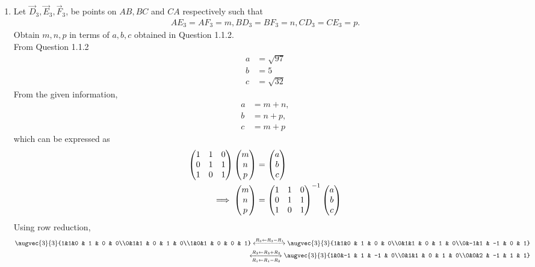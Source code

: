 \documentclass[11pt]{book}
\begin{document}
\begin{enumerate}[label=\thesection.\arabic*.,ref=\thesection.\theenumi]


\item Let $\vec{D}_3, \vec{E}_3, \vec{F}_3$, be points on $AB, BC$ and $CA$ respectively such that
\begin{align}
AE_3 = AF_3 = m, BD_3 = BF_3 = n, CD_3 = CE_3 = p.
\end{align}
Obtain $m,n,p$ in terms of $a,b,c$ obtained in Question 1.1.2. \\ 
\solution 
From Question 1.1.2
\begin{align}
    a &= \sqrt{97} \\ b &= 5 \\ c &= \sqrt{32}
\end{align}
From the given information, 
\begin{align}
% 
    a &= m+n,\\
    b &= n+p, \\
    c &= m+p 
\end{align}
which can be expressed as
\begin{align}
\begin{pmatrix}1&1&0\\0&1&1\\1&0&1\\\end{pmatrix}\begin{pmatrix}m\\n\\p\end{pmatrix} &= \begin{pmatrix}a\\b\\c\end{pmatrix}
\\
\implies 
	\begin{pmatrix}m\\n\\p\end{pmatrix} &= \begin{pmatrix}1&1&0\\0&1&1\\1&0&1\\\end{pmatrix}^{-1}\begin{pmatrix}a\\b\\c\end{pmatrix}
\end{align}
Using row reduction,
\begin{align}
\augvec{3}{3}{1&1&0 & 1 & 0 & 0\\0&1&1 & 0 & 1 & 0\\1&0&1 & 0 & 0 & 1}
\xleftrightarrow[]{R_3 \leftarrow R_3 - R_1}
\augvec{3}{3}{1&1&0 & 1 & 0 & 0\\0&1&1 & 0 & 1 & 0\\0&-1&1 & -1 & 0 & 1} \\
\xleftrightarrow[R_1 \leftarrow R_1 - R_2]{R_3 \leftarrow R_3 + R_2}
\augvec{3}{3}{1&0&-1 & 1 & -1 & 0\\0&1&1 & 0 & 1 & 0\\0&0&2 & -1 & 1 & 1} \\

\end{align}
\end{enumerate}
\end{document}
